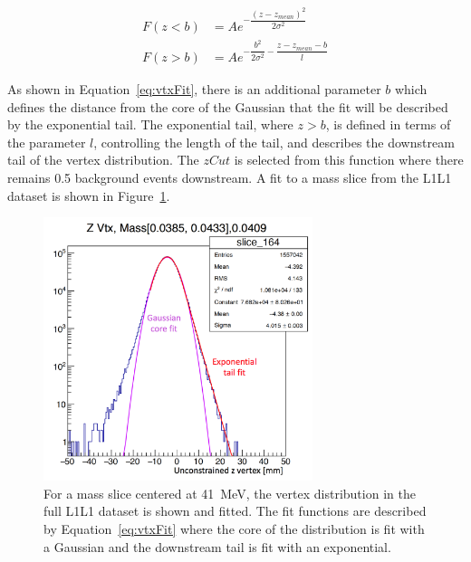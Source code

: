 \begin{equation}
\label{eq:vtxFit}
\begin{split}
F(z < b) & =  Ae^{-\dfrac{(z-z_{mean})^2}{2\sigma^2}}\\
F(z > b) & =  Ae^{-\dfrac{b^2}{2\sigma^2}-\dfrac{z-z_{mean}-b}{l}}
\end{split}
\end{equation}

As shown in Equation~\eqref{eq:vtxFit}, there is an additional parameter $b$ which defines the distance from the core of the Gaussian that the fit will be described by the exponential tail. The exponential tail, where $z>b$, is defined in terms of the parameter $l$, controlling the length of the tail, and describes the downstream tail of the vertex distribution. The $zCut$ is selected from this function where there remains 0.5 background events downstream. A fit to a mass slice from the L1L1 dataset is shown in Figure~\ref{fig:vtxFitPic}.

\begin{figure}[htb]
  \centering
      \includegraphics[width=0.7\textwidth]{pics/searching/vtxFit.png}
  \caption[Fit to vertex slice at a mass of 41~MeV]{For a mass slice centered at 41~MeV, the vertex distribution in the full L1L1 dataset is shown and fitted. The fit functions are described by Equation~\eqref{eq:vtxFit} where the core of the distribution is fit with a Gaussian and the downstream tail is fit with an exponential.}
  \label{fig:vtxFitPic}
\end{figure} 

